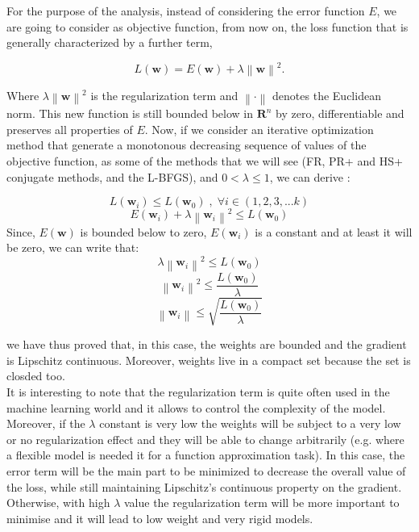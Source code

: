 \documentclass[11pt]{article}
\newcommand{\norm}[1]{\left\lVert#1\right\rVert}
\begin{document}
\noindent For the purpose of the analysis, instead of considering the error function $E$, we are going to consider as objective function, from now on, the loss function that is generally characterized by a further term,

\begin{equation}
    \label{eq:loss_f}
    L(\mathbf{w}) = E(\mathbf{w}) + \lambda\norm{\mathbf{w}}^2.
\end{equation}


Where $\lambda\norm{\mathbf{w}}^2$ is the regularization term and $\norm{\cdot}$ denotes the Euclidean norm. This new function is still bounded below in $\mathbf{R}^n$  by zero, differentiable and preserves all properties of $E$. Now, if we consider an iterative optimization method that generate a monotonous decreasing sequence of values of the objective function, as some of the methods that we will see (FR, PR+ and HS+ conjugate methods, and the L-BFGS), and $0<\lambda \leq 1$, we can derive
:

$$L(\mathbf{w}_i) \leq L(\mathbf{w}_0)\; , \; \forall i \in (1,2,3, ...k)$$
$$E(\mathbf{w}_i) + \lambda \norm{\mathbf{w}_i}^2 \leq L(\mathbf{w}_0)$$
Since, $E(\mathbf{w})$ is bounded below to zero,  $E(\mathbf{w}_i)$ is a constant and at least it will be zero, we can write that:
$$\lambda \norm{\mathbf{w}_i}^2 \leq L(\mathbf{w}_0)$$
$$\norm{\mathbf{w}_i}^2 \leq \frac{L(\mathbf{w}_0)}{\lambda} $$
$$\norm{\mathbf{w}_i} \leq \sqrt{\frac{L(\mathbf{w}_0)}{\lambda}} $$

we have thus proved that, in this case, the weights are bounded and the gradient is Lipschitz continuous. Moreover, weights live in a compact set because the set is closded too. \\

It is interesting to note that the regularization term is quite often used in the machine learning world and it allows to control the complexity of the model. Moreover, if the $\lambda$ constant is very low the weights will be subject to a very low or no regularization effect and they will be able to change arbitrarily (e.g. where a flexible model is needed it for a function approximation task). In this case, the error term will be the main part to be minimized to decrease the overall value of the loss, while still maintaining Lipschitz's continuous property on the gradient. Otherwise, with high $\lambda$ value the regularization term will be more important to minimise and it will lead to low weight and very rigid models.
\end{document}
